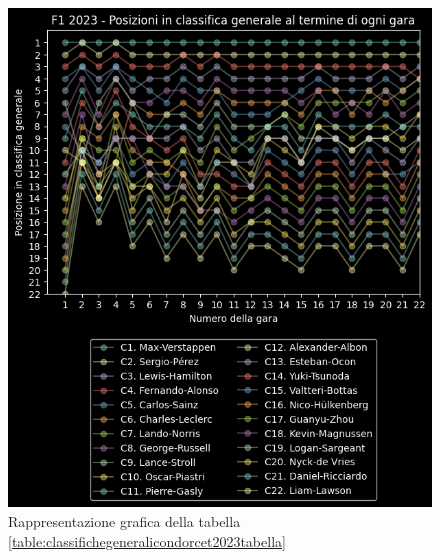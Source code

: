 \documentclass[12pt,a4paper,openright,twoside]{book}
\begin{document}
\begin{figure}[H]
    \centering
     \includegraphics[scale=1.0]{figures/condorcetstandings2023.png}
     \caption{Rappresentazione grafica della tabella \ref{table:classifichegeneralicondorcet2023tabella} }
     \label{fig:classifichegeneralicondorcet2023figura}
 \end{figure}
\end{document}
